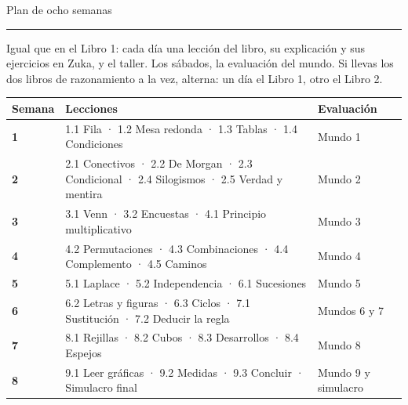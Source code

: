 \clearpage\renewcommand{\zuka@mundoactual}{Plan de estudio}
{\sffamily\fontsize{26}{30}\selectfont\firalight Plan de ocho semanas\par}\vspace{2pt}
{\color{zlime}\rule{18mm}{1.6pt}}\par\vspace{6pt}
{\small Igual que en el Libro 1: cada día una lección del libro, su explicación y sus ejercicios en Zuka, y el taller. Los sábados,
la evaluación del mundo. Si llevas los dos libros de razonamiento a la vez, alterna: un día el Libro 1, otro el Libro 2.\par}
\vspace{6pt}
\begin{center}\small
\begin{tabularx}{\linewidth}{@{}>{\sffamily\bfseries\color{zolive}}lX>{\raggedleft\arraybackslash}p{24mm}@{}}
\toprule
\textbf{Semana} & \textbf{Lecciones} & \textbf{Evaluación}\\\midrule
1 & 1.1 Fila · 1.2 Mesa redonda · 1.3 Tablas · 1.4 Condiciones & Mundo 1\\
2 & 2.1 Conectivos · 2.2 De Morgan · 2.3 Condicional · 2.4 Silogismos · 2.5 Verdad y mentira & Mundo 2\\
3 & 3.1 Venn · 3.2 Encuestas · 4.1 Principio multiplicativo & Mundo 3\\
4 & 4.2 Permutaciones · 4.3 Combinaciones · 4.4 Complemento · 4.5 Caminos & Mundo 4\\
5 & 5.1 Laplace · 5.2 Independencia · 6.1 Sucesiones & Mundo 5\\
6 & 6.2 Letras y figuras · 6.3 Ciclos · 7.1 Sustitución · 7.2 Deducir la regla & Mundos 6 y 7\\
7 & 8.1 Rejillas · 8.2 Cubos · 8.3 Desarrollos · 8.4 Espejos & Mundo 8\\
8 & 9.1 Leer gráficas · 9.2 Medidas · 9.3 Concluir · Simulacro final & Mundo 9 y simulacro\\
\bottomrule
\end{tabularx}
\end{center}

